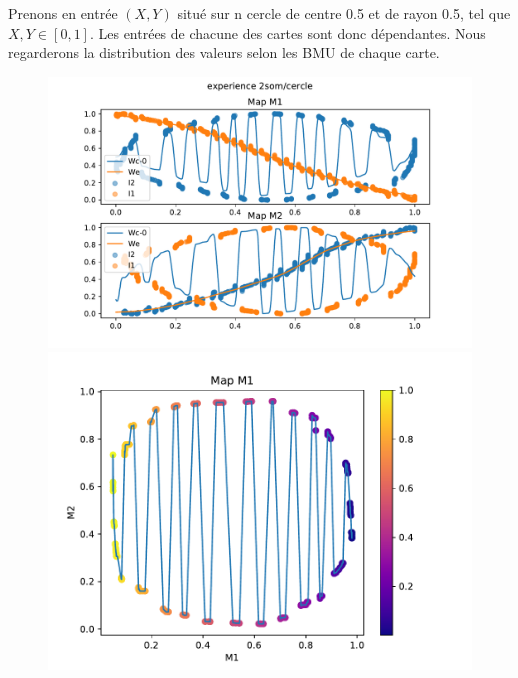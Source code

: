 Prenons en entrée $(X,Y)$ situé sur n cercle de centre 0.5 et de rayon 0.5, tel que $X,Y \in [0,1]$. 
Les entrées de chacune des cartes sont donc dépendantes. Nous regarderons la distribution des valeurs selon les BMU de chaque carte.
\begin{figure}
\begin{minipage}{0.33\textwidth}
\includegraphics[width=\textwidth]{2som_cercle_w.pdf}
\end{minipage}
\begin{minipage}{0.33\textwidth}
\includegraphics[width=\textwidth]{2som_cercle_d.pdf}
\end{minipage}
\begin{minipage}{0.33\textwidth}

\end{minipage}
\end{figure}
